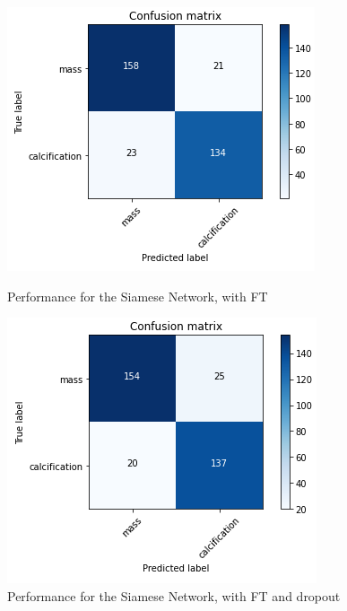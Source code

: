 \documentclass[11pt,a4paper,oneside]{article}
\begin{document}
\begin{figure}[h]
	\begin{minipage}[c]{.4\textwidth}
		\centering\setlength{\captionmargin}{0pt}%
		\includegraphics[width=.9\textwidth]{images/4.1/Siamese/Conf_MatrixFT}
		\caption{Performance for the Siamese Network, with FT}
		\label{fig:siamese_fe}
	\end{minipage}
	\hspace{5mm}%
	\begin{minipage}[c]{.4\textwidth}
		\centering\setlength{\captionmargin}{0pt}%
		\includegraphics[width=.9\textwidth]{images/4.1/Siamese/Conf_MatrixFT_drop}
		\caption{Performance for the Siamese Network, with FT and dropout}
		\label{fig:siamese_ft}
	\end{minipage}
\end{figure}
\end{document}
